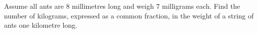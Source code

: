 Assume all ants are $8$ millimetres long and weigh $7$ milligrams each. Find the number of kilograms, expressed as a common fraction, in the weight of a string of ants one kilometre long.

